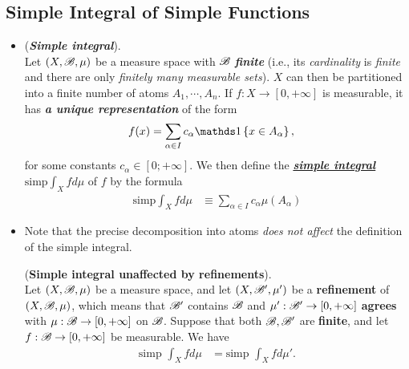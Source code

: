 \documentclass[11pt]{article}
\begin{document}
\subsection{Simple Integral of Simple Functions}
\begin{itemize}
\item \begin{definition} (\emph{\textbf{Simple integral}}).\\
 Let $(X, {\mathscr B}, \mu)$ be a measure space with ${\mathscr B}$ \emph{\textbf{finite}} (i.e., its \emph{cardinality} is \emph{finite} and there are only \emph{finitely many measurable sets}). $X$ can then be partitioned into a finite number of atoms $A_1, \cdots, A_n$. If $f : X \rightarrow [0, +\infty]$ is measurable, it has \emph{\textbf{a unique representation}} of the form
\begin{align*}
f(x)&= \sum_{\alpha \in I}c_{\alpha}\ind{x\in A_{\alpha}},
\end{align*} 
for some constants $c_{\alpha} \in [0;+\infty]$. We then define the \underline{\emph{\textbf{simple integral}}}
$\text{simp}\int_{X} f d\mu$ of $f$ by the formula
\begin{align*}
\text{simp}\int_{X} f d\mu &\equiv \sum_{\alpha\in I}c_{\alpha}\mu(A_{\alpha})
\end{align*} 
\end{definition}

\item \begin{remark}
Note that the precise decomposition into atoms \emph{does not affect} the definition of the simple integral. 
\begin{proposition}\label{prop: simple_integral_refinement} (\textbf{Simple integral unaffected by refinements}).  \citep{tao2011introduction} \\
Let $(X, {\mathscr B}, \mu)$ be a measure space, and let $(X, {\mathscr B}', \mu')$ be a \textbf{refinement} of $(X, {\mathscr B}, \mu)$, which means that ${\mathscr B}'$ contains ${\mathscr B}$ and $\mu': {\mathscr B}' \rightarrow [0, +\infty]$ \textbf{agrees} with $\mu: {\mathscr B} \rightarrow [0, +\infty]$ on ${\mathscr B}$. Suppose that both ${\mathscr B}, {\mathscr B}'$ are \textbf{finite}, and let $f: {\mathscr B} \rightarrow [0, +\infty]$ be measurable. We have
\begin{align*}
\text{simp }\int_{X} f d\mu &= \text{simp }\int_{X} f d\mu'.
\end{align*}
\end{proposition}
\end{remark}



\end{itemize}
\end{document}
